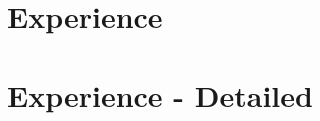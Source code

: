 \documentclass[11pt,a4paper,sans]{moderncv}
\begin{document}
\makecvtitle{}

\vspace{-3em}



\section{Experience}




\closesection{}

\pagebreak 





\pagebreak

\section{Experience - Detailed}




\closesection{}


\end{document}

